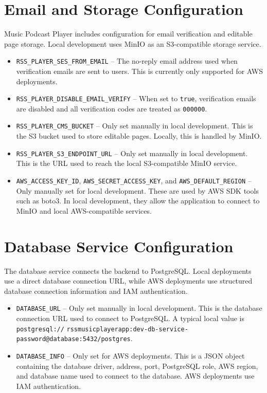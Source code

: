 \documentclass{article}
\begin{document}
\section{Email and Storage Configuration}
Music Podcast Player includes configuration for email verification and editable page storage. Local development uses MinIO as an S3-compatible storage service.
\begin{itemize}
    \item \texttt{RSS\_PLAYER\_SES\_FROM\_EMAIL} -- The no-reply email address used when verification emails are sent to users. This is currently only supported for AWS deployments.
    \item \texttt{RSS\_PLAYER\_DISABLE\_EMAIL\_VERIFY} -- When set to \texttt{true}, verification emails are disabled and all verification codes are treated as \texttt{000000}.
    \item \texttt{RSS\_PLAYER\_CMS\_BUCKET} -- Only set manually in local development. This is the S3 bucket used to store editable pages. Locally, this is handled by MinIO.
    \item \texttt{RSS\_PLAYER\_S3\_ENDPOINT\_URL} -- Only set manually in local development. This is the URL used to reach the local S3-compatible MinIO service.
    \item \texttt{AWS\_ACCESS\_KEY\_ID}, \texttt{AWS\_SECRET\_ACCESS\_KEY}, and \texttt{AWS\_DEFAULT\_REGION} -- Only manually set for local development. These are used by AWS SDK tools such as boto3. In local development, they allow the application to connect to MinIO and local AWS-compatible services.
\end{itemize}

\section{Database Service Configuration}
The database service connects the backend to PostgreSQL. Local deployments use a direct database connection URL, while AWS deployments use structured database connection information and IAM authentication.
\begin{itemize}
    \item \texttt{DATABASE\_URL} -- Only set manually in local development. This is the database connection URL used to connect to PostgreSQL. A typical local value is \texttt{postgresql://} 
    \texttt{rssmusicplayerapp:dev-db-service-password@database:5432/postgres}.
    \item \texttt{DATABASE\_INFO} -- Only set for AWS deployments. This is a JSON object containing the database driver, address, port, PostgreSQL role, AWS region, and database name used to connect to the database. AWS deployments use IAM authentication.
\end{itemize}
\end{document}
